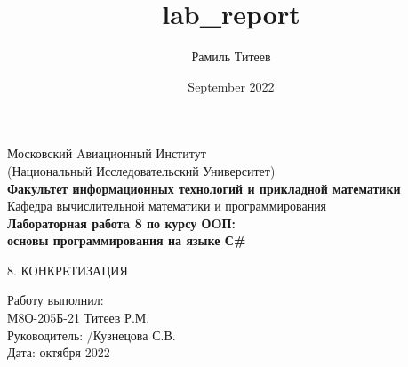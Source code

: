 \documentclass[12pt]{report}
\title{lab_report}
\author{Рамиль Титеев}
\date{September 2022}
\begin{document}
    \begin{titlepage}
        \begin{center}
            \large{Московский Aвиационный Институт}\\
            \large{(Национальный Исследовательский Университет)}\\
            \vspace{0.4in}
            \textbf{\LARGE{Факультет информационных технологий и прикладной математики}}\\
            \vspace{0.4in}
            \large{Кафедра вычислительной математики и программирования}\\
            \vspace{0.4in}
            \textbf{\LARGE{Лабораторная работa 8 по курсу ОOП:}}\\
            \textbf{\LARGE{основы программирования на языке С\#}}\\
        \end{center}
        \vspace{0.6in}
        \small{8. КОНКРЕТИЗАЦИЯ}\\
        \vfill
        \begin{flushleft}
                \large{ 
                    Работу выполнил:\\
                    М8О-205Б-21 \hspace{0.1in} 
                    Титеев Р.М. \hspace{0.3in}  
                    \hspace{0.3in} 
                    \\ 
                    Руководитель: /Кузнецова С.В. \\
                    Дата: \underline{\hspace{0.4in}} октября 2022\\
                }
        \end{flushleft}        
    \end{titlepage}
\end{document}
